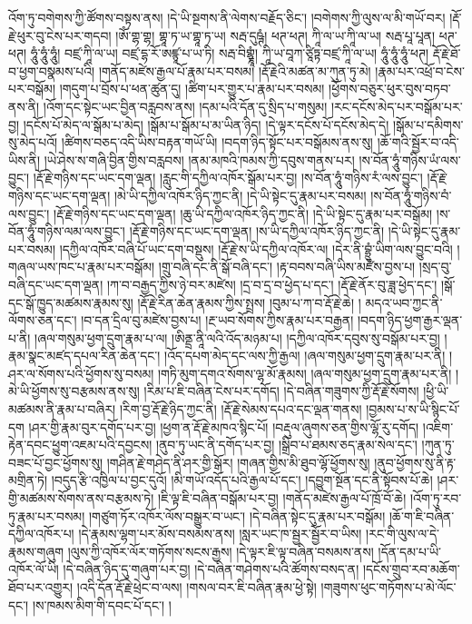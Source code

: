 འོག་ཏུ་བགེགས་ཀྱི་ཚོགས་བསྟས་ནས། །དེ་ཡི་སྔགས་ནི་ལེགས་བརྗོད་ཅིང་། །བགེགས་ཀྱི་ལུས་ལ་མི་གཡོ་བར། །རྡོ་རྗེ་ཕུར་བུ་ངེས་པར་གདབ། །ཨོཾ་གྷ་གྷ། གྷཱ་ཏ་ཡ་གྷཱ་ཏ་ཡ། སརྦ་དུཥྚཾ། ཕཊ་ཕཊ། ཀཱི་ལ་ཡ་ཀཱི་ལ་ཡ། སརྦ་པཱ་པཱན། ཕཊ་ཕཊ། ཧཱུཾ་ཧཱུཾ་ཧཱུཾ། བཛྲ་ཀཱི་ལ་ཡ། བཛྲ་དྷ་རོ་ཨཛྙཱ་པ་ཡ་ཏི། སརྦ་བིགྷྣཱཾ། ཀཱི་ཡ་བཱཀ་ཙཱིཏྟ་བཛྲ་ཀཱི་ལ་ཡ། ཧཱུཾ་ཧཱུཾ་ཧཱུཾ་ཕཊ། རྡོ་རྗེ་ཐོ་བ་ཕྱག་བསྣམས་པའི། །གནོད་མཛེས་རྒྱལ་པོ་རྣམ་པར་བསམ། །རྡོ་རྗེའི་མཚན་མ་ཀུན་ཏུ་མེ། །རྣམ་པར་འཕྲོ་བ་ངེས་པར་བསྒོམ། །གདུག་པ་བྲོས་པ་ཕན་ཚུན་དུ། །ཚིག་པར་གྱུར་པ་རྣམ་པར་བསམ། །ཕྱོགས་བཅུར་ཕུར་བུས་བཏབ་ནས་ནི། །འོག་དང་སྟེང་ཡང་བྱིན་བརླབས་ནས། །དམ་པའི་དོན་དུ་སྲིད་པ་གསུམ། །རང་དངོས་མེད་པར་བསྒོམ་པར་བྱ། །དངོས་པོ་མེད་ལ་སྒོམ་པ་མེད། །སྒོམ་པ་སྒོམ་པ་མ་ཡིན་ཉིད། །དེ་ལྟར་དངོས་པོ་དངོས་མེད་དེ། །སྒོམ་པ་དམིགས་སུ་མེད་པའོ། །ཚིགས་བཅད་འདི་ཡིས་བརྟན་གཡོ་ཡི། །བདག་ཉིད་སྟོང་པར་བསྒོམས་ནས་སུ། །ཆོ་གའི་སྦྱོར་བ་འདི་ཡིས་ནི། །ཡེ་ཤེས་ས་གཞི་བྱིན་གྱིས་བརླབས། །ནམ་མཁའི་ཁམས་ཀྱི་དབུས་གནས་པར། །ས་བོན་ཧཱུཾ་གཉིས་ཡཾ་ལས་བྱུང་། །རྡོ་རྗེ་གཉིས་དང་ཡང་དག་ལྡན། །རླུང་གི་དཀྱིལ་འཁོར་སྒོམ་པར་བྱ། །ས་བོན་ཧཱུཾ་གཉིས་རཾ་ལས་བྱུང་། །རྡོ་རྗེ་གཉིས་དང་ཡང་དག་ལྡན། །མེ་ཡི་དཀྱིལ་འཁོར་ཉིད་ཀྱང་ནི། །དེ་ཡི་སྟེང་དུ་རྣམ་པར་བསམ། །ས་བོན་ཧཱུཾ་གཉིས་བཾ་ལས་བྱུང་། །རྡོ་རྗེ་གཉིས་དང་ཡང་དག་ལྡན། །ཆུ་ཡི་དཀྱིལ་འཁོར་ཉིད་ཀྱང་ནི། །དེ་ཡི་སྟེང་དུ་རྣམ་པར་བསྒོམ། །ས་བོན་ཧཱུཾ་གཉིས་ལམ་ལས་བྱུང་། །རྡོ་རྗེ་གཉིས་དང་ཡང་དག་ལྡན། །ས་ཡི་དཀྱིལ་འཁོར་ཉིད་ཀྱང་ནི། །དེ་ཡི་སྟེང་དུ་རྣམ་པར་བསམ། །དཀྱིལ་འཁོར་བཞི་པོ་ཡང་དག་བསྡུས། །རྡོ་རྗེ་ས་ཡི་དཀྱིལ་འཁོར་ལ། །དེར་ནི་བྷྲུཾ་ཡིག་ལས་བྱུང་བའི། །གཞལ་ཡས་ཁང་པ་རྣམ་པར་བསྒོམ། །གྲུ་བཞི་དང་ནི་སྒོ་བཞི་དང་། །རྟ་བབས་བཞི་ཡིས་མཛེས་བྱས་པ། །སྲད་བུ་བཞི་དང་ཡང་དག་ལྡན། །ཀ་བ་བརྒྱད་ཀྱིས་ཉེ་བར་མཛེས། །དྲ་བ་དྲ་བ་ཕྱེད་པ་དང་། །རྡོ་རྗེ་ནོར་བུ་ཟླ་ཕྱེད་དང་། །སྒོ་དང་སྒོ་ཁྱུད་མཚམས་རྣམས་སུ། །རྡོ་རྗེ་རིན་ཆེན་རྣམས་ཀྱིས་སྤྲས། །བུམ་པ་ཀ་བ་རྡོ་རྗེ་ཆེ། །
མདའ་ཡབ་ཀྱང་ནི་ལོགས་ཅན་དང་། །བ་དན་དྲིལ་བུ་མཛེས་བྱས་པ། །རྔ་ཡབ་སོགས་ཀྱིས་རྣམ་པར་བརྒྱན། །བདག་ཉིད་ཕྱག་རྒྱར་ལྡན་པ་ནི། །ཞལ་གསུམ་ཕྱག་དྲུག་རྣམ་པ་ལ། །ཨིནྡྲ་ནཱི་ལའི་འོད་མཉམ་པ། །དཀྱིལ་འཁོར་དབུས་སུ་བསྒོམ་པར་བྱ། །རྣམ་སྣང་མཛད་དཔལ་རིན་ཆེན་དང་། །འོད་དཔག་མེད་དང་ལས་ཀྱི་རྒྱལ། །ཞལ་གསུམ་ཕྱག་དྲུག་རྣམ་པར་ནི། །ཤར་ལ་སོགས་པའི་ཕྱོགས་སུ་བསམ། །གཏི་མུག་དགའ་སོགས་ལྷ་མོ་རྣམས། །ཞལ་གསུམ་ཕྱག་དྲུག་རྣམ་པར་ནི། །མེ་ཡི་ཕྱོགས་སུ་བརྩམས་ནས་སུ། །རིམ་པ་ཇི་བཞིན་ངེས་པར་དགོད། །དེ་བཞིན་གཟུགས་ཀྱི་རྡོ་རྗེ་སོགས། །ཕྱི་ཡི་མཚམས་ནི་རྣམ་པ་བཞིར། །རིག་བྱ་རྡོ་རྗེ་ཉིད་ཀྱང་ནི། །རྡོ་རྗེ་སེམས་དཔའ་དང་ལྡན་གནས། །བྱམས་པ་ས་ཡི་སྙིང་པོ་དག །ཤར་གྱི་རྣམ་བུར་དགོད་པར་བྱ། །ཕྱག་ན་རྡོ་རྗེ་མཁའ་སྙིང་པོ། །བརྡུལ་ཞུགས་ཅན་གྱིས་ལྷོ་རུ་དགོད། །འཇིག་རྟེན་དབང་ཕྱུག་འཇམ་པའི་དབྱངས། །ནུབ་ཏུ་ཡང་ནི་དགོད་པར་བྱ། །སྒྲིབ་པ་ཐམས་ཅད་རྣམ་སེལ་དང་། །ཀུན་ཏུ་བཟང་པོ་བྱང་ཕྱོགས་སུ། །གཤིན་རྗེ་གཤེད་ནི་ཤར་གྱི་སྒོར། །གཞན་གྱིས་མི་ཐུབ་ལྷོ་ཕྱོགས་སུ། །ནུབ་ཕྱོགས་སུ་ནི་རྟ་མགྲིན་ཏེ། །བདུད་རྩི་འཁྱིལ་པ་བྱང་དུའོ། །མི་གཡོ་འདོད་པའི་རྒྱལ་པོ་དང་། །དབྱུག་སྔོན་དང་ནི་སྟོབས་པོ་ཆེ། །ཤར་གྱི་མཚམས་སོགས་ནས་བརྩམས་ཏེ། །ཇི་ལྟ་ཇི་བཞིན་བསྒོམ་པར་བྱ། །གནོད་མཛེས་རྒྱལ་པོ་ཁྲོ་བོ་ཆེ། །འོག་ཏུ་རབ་ཏུ་རྣམ་པར་བསམ། །གཙུག་ཏོར་འཁོར་ལོས་བསྒྱུར་བ་ཡང་། །དེ་བཞིན་སྟེང་དུ་རྣམ་པར་བསྒོམ། །ཆོ་ག་ཇི་བཞིན་དཀྱིལ་འཁོར་པ། །དེ་རྣམས་ལྷག་པར་མོས་བསམས་ནས། །སླར་ཡང་ཁ་སྦྱར་སྦྱོར་བ་ཡིས། །རང་གི་ལུས་ལ་དེ་རྣམས་གཞུག །ལུས་ཀྱི་འཁོར་ལོར་གཏོགས་སངས་རྒྱས། །དེ་ལྟར་ཇི་ལྟ་བཞིན་བསམས་ནས། །དོན་དམ་པ་ཡི་འཁོར་ལོ་ཡི། །དེ་བཞིན་ཉིད་དུ་གཞུག་པར་བྱ། །དེ་བཞིན་གཤེགས་པའི་ཚོགས་བསད་ན། །དངོས་གྲུབ་རབ་མཆོག་ཐོབ་པར་འགྱུར། །འདི་དོན་རྡོ་རྗེ་ཕྲེང་བ་ལས། །གསལ་བར་ཇི་བཞིན་རྣམ་ཕྱེ་སྟེ། །གཟུགས་ཕུང་གཏོགས་པ་མེ་ལོང་དང་། །ས་ཁམས་མིག་གི་དབང་པོ་དང་། །

